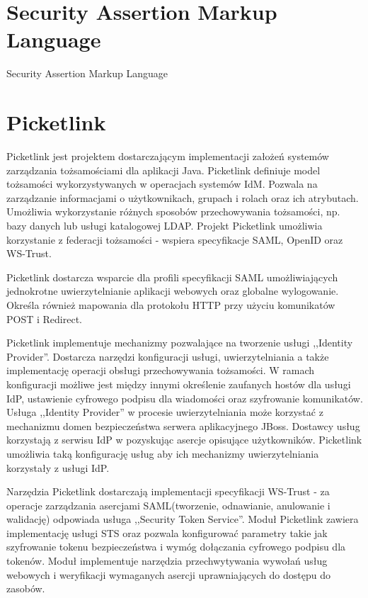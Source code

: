 \section{Security Assertion Markup Language}
\label{sec:saml}

Security Assertion Markup Language


\section{Picketlink}
\label{sec:picketlink}

Picketlink jest projektem dostarczającym implementacji założeń systemów zarządzania tożsamościami dla aplikacji Java. Picketlink definiuje model tożsamości wykorzystywanych w operacjach systemów IdM. Pozwala na zarządzanie informacjami o użytkownikach, grupach i rolach oraz ich atrybutach. Umożliwia wykorzystanie różnych sposobów przechowywania tożsamości, np. bazy danych lub usługi katalogowej LDAP. Projekt Picketlink umożliwia korzystanie z federacji tożsamości - wspiera specyfikacje SAML, OpenID oraz WS-Trust\cite{PicketLink13}.

Picketlink dostarcza wsparcie dla profili specyfikacji SAML umożliwiających jednokrotne uwierzytelnianie aplikacji webowych oraz globalne wylogowanie. Określa również mapowania dla protokołu HTTP przy użyciu komunikatów POST i Redirect. 

Picketlink implementuje mechanizmy pozwalające na tworzenie usługi ,,Identity Provider''. Dostarcza narzędzi konfiguracji usługi, uwierzytelniania a także implementację operacji obsługi przechowywania tożsamości. W ramach konfiguracji możliwe jest między innymi określenie zaufanych hostów dla usługi IdP, ustawienie cyfrowego podpisu dla wiadomości oraz szyfrowanie komunikatów. Usługa ,,Identity Provider'' w procesie uwierzytelniania może korzystać z mechanizmu domen bezpieczeństwa serwera aplikacyjnego JBoss. Dostawcy usług korzystają z serwisu IdP w pozyskując asercje opisujące użytkowników. Picketlink umożliwia taką konfigurację usług aby ich mechanizmy uwierzytelniania korzystały z usługi IdP.

Narzędzia Picketlink dostarczają implementacji specyfikacji WS-Trust - za operacje zarządzania asercjami SAML(tworzenie, odnawianie, anulowanie i walidację) odpowiada usługa ,,Security Token Service''. Moduł Picketlink zawiera implementację usługi STS oraz pozwala konfigurować parametry takie jak szyfrowanie tokenu bezpieczeństwa i wymóg dołączania cyfrowego podpisu dla tokenów. Moduł implementuje narzędzia przechwytywania wywołań usług webowych i weryfikacji wymaganych asercji uprawniających do dostępu do zasobów. 

